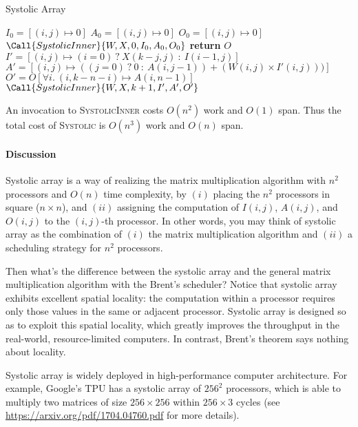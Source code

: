 \documentclass[11pt,a4paper,oneside,microtype,chapter,nokorean]{oblivoir}
\begin{document}
\begin{algorithm}
  \caption{Systolic Array}\label{systolic}
  \begin{algorithmic}[1]
     
    \State $I_0 = [(i,j) \mapsto 0]$ 
    \State $A_0 = [(i,j) \mapsto 0]$ 
    \State $O_0 = [(i,j) \mapsto 0]$ 
    \State $\Call{SystolicInner}{W,X,0,I_0,A_0,O_0}$
    \EndProcedure
    \Statex
     
    \State \textbf{return} $O$
    \EndIf
    \State $I' = [(i,j) \mapsto (i=0)~?~X(k-j,j)~:~I(i-1,j)]$
    \State $A' = [(i,j) \mapsto ((j=0)~?~0~:~A(i,j-1)) + (W(i,j) \times I'(i,j)))]$
    \State $O' = O[\forall i.~(i,k-n-i) \mapsto A(i,n-1)]$
    \State $\Call{SystolicInner}{W,X,k+1,I',A',O'}$
    \EndProcedure
  \end{algorithmic}
\end{algorithm}

An invocation to \textsc{SystolicInner} costs $O(n^2)$ work and $O(1)$ span.  Thus the total cost of
\textsc{Systolic} is $O(n^3)$ work and $O(n)$ span.


\paragraph{Discussion}

Systolic array is a way of realizing the matrix multiplication algorithm with $n^2$ processors and
$O(n)$ time complexity, by $(i)$ placing the $n^2$ processors in square ($n \times n$), and $(ii)$
assigning the computation of $I(i,j)$, $A(i,j)$, and $O(i,j)$ to the $(i,j)$-th processor.  In other
words, you may think of systolic array as the combination of $(i)$ the matrix multiplication
algorithm and $(ii)$ a scheduling strategy for $n^2$ processors.

Then what's the difference between the systolic array and the general matrix multiplication
algorithm with the Brent's scheduler?  Notice that systolic array exhibits excellent spatial
locality: the computation within a processor requires only those values in the same or adjacent
processor.  Systolic array is designed so as to exploit this spatial locality, which greatly
improves the throughput in the real-world, resource-limited computers.  In contrast, Brent's theorem
says nothing about locality.

Systolic array is widely deployed in high-performance computer architecture.  For example, Google's
TPU has a systolic array of ${256}^2$ processors, which is able to multiply two matrices of size
$256 \times 256$ within $256 \times 3$ cycles (see \url{https://arxiv.org/pdf/1704.04760.pdf} for
more details).
\end{document}
